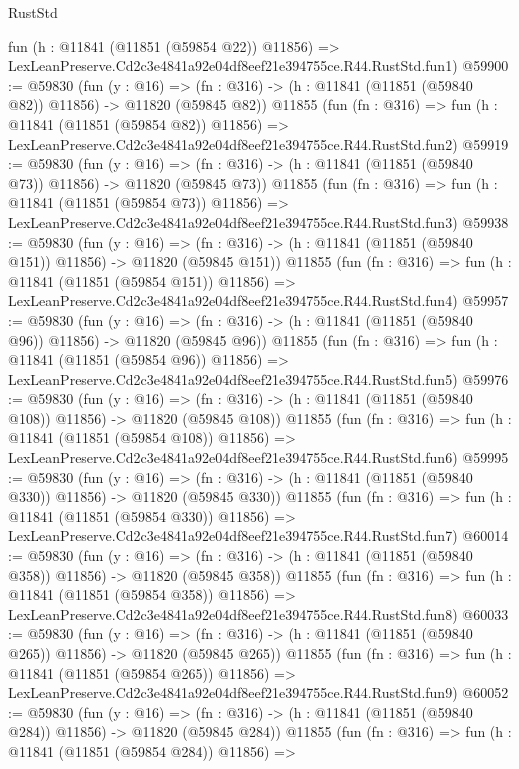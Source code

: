 \begin{lexlean}{RustStd}
\begin{coremodule}
    fun (h : @11841 (@11851 (@59854 @22)) @11856) =>
    LexLeanPreserve.Cd2c3e4841a92e04df8eef21e394755ce.R44.RustStd.fun1)
@59900 := @59830
    (fun (y : @16) =>
    (fn : @316) -> (h : @11841 (@11851 (@59840 @82)) @11856) -> @11820 (@59845 @82))
    @11855
    (fun (fn : @316) =>
    fun (h : @11841 (@11851 (@59854 @82)) @11856) =>
    LexLeanPreserve.Cd2c3e4841a92e04df8eef21e394755ce.R44.RustStd.fun2)
@59919 := @59830
    (fun (y : @16) =>
    (fn : @316) -> (h : @11841 (@11851 (@59840 @73)) @11856) -> @11820 (@59845 @73))
    @11855
    (fun (fn : @316) =>
    fun (h : @11841 (@11851 (@59854 @73)) @11856) =>
    LexLeanPreserve.Cd2c3e4841a92e04df8eef21e394755ce.R44.RustStd.fun3)
@59938 := @59830
    (fun (y : @16) =>
    (fn : @316) -> (h : @11841 (@11851 (@59840 @151)) @11856) -> @11820 (@59845 @151))
    @11855
    (fun (fn : @316) =>
    fun (h : @11841 (@11851 (@59854 @151)) @11856) =>
    LexLeanPreserve.Cd2c3e4841a92e04df8eef21e394755ce.R44.RustStd.fun4)
@59957 := @59830
    (fun (y : @16) =>
    (fn : @316) -> (h : @11841 (@11851 (@59840 @96)) @11856) -> @11820 (@59845 @96))
    @11855
    (fun (fn : @316) =>
    fun (h : @11841 (@11851 (@59854 @96)) @11856) =>
    LexLeanPreserve.Cd2c3e4841a92e04df8eef21e394755ce.R44.RustStd.fun5)
@59976 := @59830
    (fun (y : @16) =>
    (fn : @316) -> (h : @11841 (@11851 (@59840 @108)) @11856) -> @11820 (@59845 @108))
    @11855
    (fun (fn : @316) =>
    fun (h : @11841 (@11851 (@59854 @108)) @11856) =>
    LexLeanPreserve.Cd2c3e4841a92e04df8eef21e394755ce.R44.RustStd.fun6)
@59995 := @59830
    (fun (y : @16) =>
    (fn : @316) -> (h : @11841 (@11851 (@59840 @330)) @11856) -> @11820 (@59845 @330))
    @11855
    (fun (fn : @316) =>
    fun (h : @11841 (@11851 (@59854 @330)) @11856) =>
    LexLeanPreserve.Cd2c3e4841a92e04df8eef21e394755ce.R44.RustStd.fun7)
@60014 := @59830
    (fun (y : @16) =>
    (fn : @316) -> (h : @11841 (@11851 (@59840 @358)) @11856) -> @11820 (@59845 @358))
    @11855
    (fun (fn : @316) =>
    fun (h : @11841 (@11851 (@59854 @358)) @11856) =>
    LexLeanPreserve.Cd2c3e4841a92e04df8eef21e394755ce.R44.RustStd.fun8)
@60033 := @59830
    (fun (y : @16) =>
    (fn : @316) -> (h : @11841 (@11851 (@59840 @265)) @11856) -> @11820 (@59845 @265))
    @11855
    (fun (fn : @316) =>
    fun (h : @11841 (@11851 (@59854 @265)) @11856) =>
    LexLeanPreserve.Cd2c3e4841a92e04df8eef21e394755ce.R44.RustStd.fun9)
@60052 := @59830
    (fun (y : @16) =>
    (fn : @316) -> (h : @11841 (@11851 (@59840 @284)) @11856) -> @11820 (@59845 @284))
    @11855
    (fun (fn : @316) =>
    fun (h : @11841 (@11851 (@59854 @284)) @11856) =>

\end{coremodule}
\end{lexlean}
